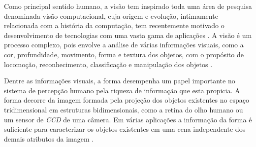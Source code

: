 


Como principal sentido humano, a visão tem inspirado toda uma área de pesquisa denominada visão computacional, cuja origem e evolução, intimamente relacionada com a história da computação, tem recentemente motivado o desenvolvimento de tecnologias com uma vasta gama de aplicações \cite{Costa:2009}. A visão é um processo complexo, pois envolve a análise de várias informações visuais, como a cor, profundidade, movimento, forma e textura dos objetos, com o propósito de locomoção, reconhecimento, classificação e manipulação dos objetos \cite{Ullman:1996}.


Dentre as informações visuais, a forma desempenha um papel importante no sistema de percepção humano pela riqueza de informação que esta propicia. A forma decorre da imagem formada pela projeção dos objetos existentes no espaço tridimensional em estruturas bidimensionais, como a retina do olho humano ou um sensor de \emph{CCD} de uma câmera. Em várias aplicações a informação da forma é suficiente para caracterizar os objetos existentes em uma cena independente dos demais atributos da imagem \cite{Costa:2009}.


